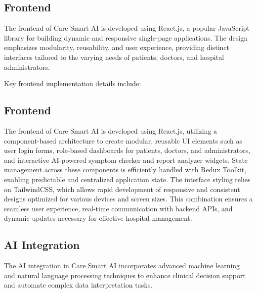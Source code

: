 \documentclass[conference]{IEEEtran}
\begin{document}
\subsection{Frontend}

The frontend of Care Smart AI is developed using React.js, a popular JavaScript library for building dynamic and responsive single-page applications. The design emphasizes modularity, reusability, and user experience, providing distinct interfaces tailored to the varying needs of patients, doctors, and hospital administrators.

Key frontend implementation details include:

\subsection{Frontend}

The frontend of Care Smart AI is developed using React.js, utilizing a component-based architecture to create modular, reusable UI elements such as user login forms, role-based dashboards for patients, doctors, and administrators, and interactive AI-powered symptom checker and report analyzer widgets. State management across these components is efficiently handled with Redux Toolkit, enabling predictable and centralized application state. The interface styling relies on TailwindCSS, which allows rapid development of responsive and consistent designs optimized for various devices and screen sizes. This combination ensures a seamless user experience, real-time communication with backend APIs, and dynamic updates necessary for effective hospital management.



\subsection{AI Integration}

The AI integration in Care Smart AI incorporates advanced machine learning and natural language processing techniques to enhance clinical decision support and automate complex data interpretation tasks.
\end{document}
